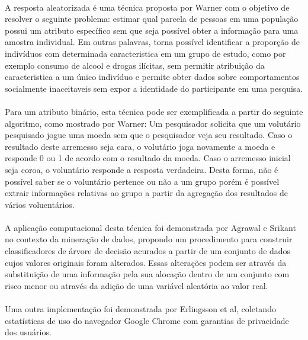 \paragraph{} A resposta aleatorizada é uma técnica proposta por Warner\cite{warner1965randomized} com o objetivo de resolver o seguinte problema: estimar qual parcela de pessoas em uma população possui um atributo específico sem que seja possível obter a informação para uma amostra individual. Em outras palavras, torna possível identificar a proporção de indivíduos com determinada caracteristica em um grupo de estudo, como por exemplo consumo de alcool e drogas ilícitas\cite{davila2010modelo}, sem permitir atribuição da caracteristica a um único indivíduo e permite obter dados sobre comportamentos socialmente inaceitaveis sem expor a identidade do participante em uma pesquisa.

\paragraph{} Para um atributo binário, esta técnica pode ser exemplificada a partir do seguinte algoritmo, como mostrado por Warner: Um pesquisador solicita que um volutário pesquisado jogue uma moeda sem que o pesquisador veja seu resultado. Caso o resultado deste arremesso seja cara, o volutário joga novamente a moeda e responde 0 ou 1 de acordo com o resultado da moeda. Caso o arremesso inicial seja coroa, o voluntário responde a resposta verdadeira.  Desta forma, não é possível saber se o voluntário pertence ou não a um grupo porém é possível extrair informações relativas ao grupo a partir da agregação dos resultados de vários voluentários.

\paragraph{} A aplicação computacional desta técnica foi demonstrada por Agrawal e Srikant\cite{agrawal2000privacy} no contexto da mineração de dados, propondo um procedimento para construir classificadores de árvore de decisão acurados a partir de um conjunto de dados cujos valores originais foram alterados. Essas alterações podem ser através da substituição de uma informação pela sua alocação dentro de um conjunto com risco menor ou através da adição de uma variável aleatória ao valor real.

\paragraph{} Uma outra implementação foi demonstrada por Erlingsson et al\cite{erlingsson2014rappor}, coletando estatísticas de uso do navegador Google Chrome com garantias de privacidade dos usuários.

